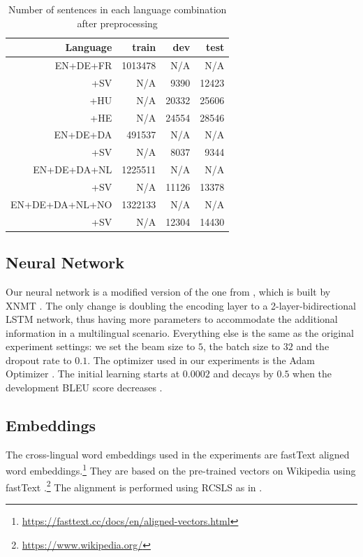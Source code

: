 \documentclass[thesis,fonts=libertine]{cluu}
\begin{document}
\begin{table}
  \centering
  \begin{tabular}{r|rrr}
    \hline
    \textbf{Language} & \textbf{train} & \textbf{dev} & \textbf{test} \\ [0.25ex]
    \hline\hline
    EN+DE+FR & 1013478 & N/A & N/A \\
    +SV & N/A & 9390 & 12423 \\
    +HU & N/A & 20332 & 25606 \\
    +HE & N/A & 24554 & 28546 \\
    \hline
    EN+DE+DA & 491537 & N/A & N/A \\
    +SV & N/A & 8037 & 9344 \\
    \hline
    EN+DE+DA+NL & 1225511 & N/A & N/A \\
    +SV & N/A & 11126 & 13378 \\
    \hline
    EN+DE+DA+NL+NO & 1322133 & N/A & N/A \\
    +SV & N/A & 12304 & 14430 \\
    \hline
  \end{tabular}
  \caption{Number of sentences in each language combination after preprocessing}
  \label{table:preprocessing}
\end{table}

\subsection{Neural Network}

Our neural network is a modified version of the one from \textcite{Qi:2018aa}, which is built by XNMT \parencite{Neubig:2018aa}. The only change is doubling the encoding layer to a 2-layer-bidirectional LSTM network, thus having more parameters to accommodate the additional information in a multilingual scenario. Everything else is the same as the original experiment settings: we set the beam size to $5$, the batch size to $32$ and the dropout rate to $0.1$. The optimizer used in our experiments is the Adam Optimizer \parencite{Kingma:2014aa}. The initial learning starts at $0.0002$ and decays by $0.5$ when the development BLEU score decreases \parencite{Denkowski:2017aa}.

\subsection{Embeddings}

The cross-lingual word embeddings used in the experiments are fastText aligned word embeddings.\footnote{\url{https://fasttext.cc/docs/en/aligned-vectors.html}} They are based on the pre-trained vectors on Wikipedia using fastText \parencite{Bojanowski:2016aa}.\footnote{\url{https://www.wikipedia.org/}} The alignment is performed using RCSLS as in \textcite{Joulin:2018aa}.
\end{document}
